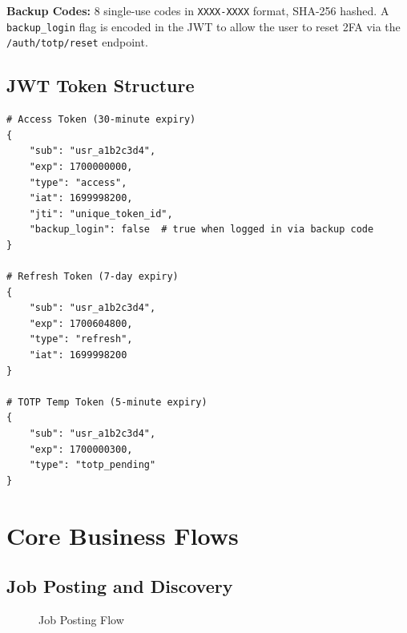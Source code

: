 \documentclass[12pt,a4paper]{article}
\begin{document}
\textbf{Backup Codes:} 8 single-use codes in \texttt{XXXX-XXXX} format, SHA-256 hashed. A \texttt{backup\_login} flag is encoded in the JWT to allow the user to reset 2FA via the \texttt{/auth/totp/reset} endpoint.

\subsection{JWT Token Structure}

\begin{lstlisting}[style=pythonstyle]
# Access Token (30-minute expiry)
{
    "sub": "usr_a1b2c3d4",
    "exp": 1700000000,
    "type": "access",
    "iat": 1699998200,
    "jti": "unique_token_id",
    "backup_login": false  # true when logged in via backup code
}

# Refresh Token (7-day expiry)
{
    "sub": "usr_a1b2c3d4",
    "exp": 1700604800,
    "type": "refresh",
    "iat": 1699998200
}

# TOTP Temp Token (5-minute expiry)
{
    "sub": "usr_a1b2c3d4",
    "exp": 1700000300,
    "type": "totp_pending"
}
\end{lstlisting}

\section{Core Business Flows}

\subsection{Job Posting and Discovery}

\begin{figure}[h]
\centering
{}
\caption{Job Posting Flow}
\end{figure}
\end{document}
